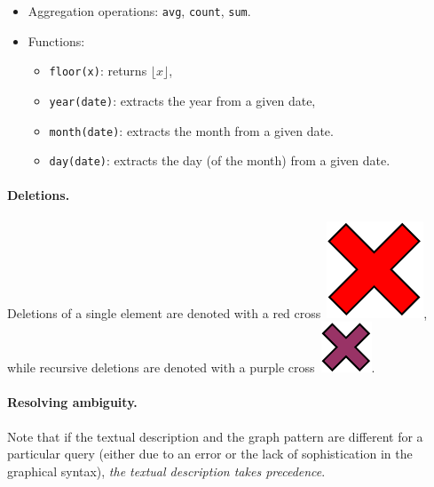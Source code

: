 \begin{itemize}
	\item Aggregation operations:
	\lstinline{avg},
	\lstinline{count}, 
	\lstinline{sum}.
	\item Functions:
	\begin{itemize}
		\item \lstinline{floor(x)}: returns $\lfloor x \rfloor$,
		\item \lstinline{year(date)}: extracts the year from a given date,
		\item \lstinline{month(date)}: extracts the month from a given date.
		\item \lstinline{day(date)}: extracts the day (of the month) from a given date.
	\end{itemize}
\end{itemize}

\paragraph{Deletions.}
Deletions of a single element are denoted with a red cross~\includegraphics[scale=0.25]{patterns/delete-single},
while recursive deletions are denoted with a purple cross~\includegraphics[scale=0.25]{patterns/delete-recursively}.

\paragraph{Resolving ambiguity.}

Note that if the textual description and the graph pattern are different for a particular query (either due to an error or the lack of sophistication in the graphical syntax), \emph{the textual description takes precedence}.


